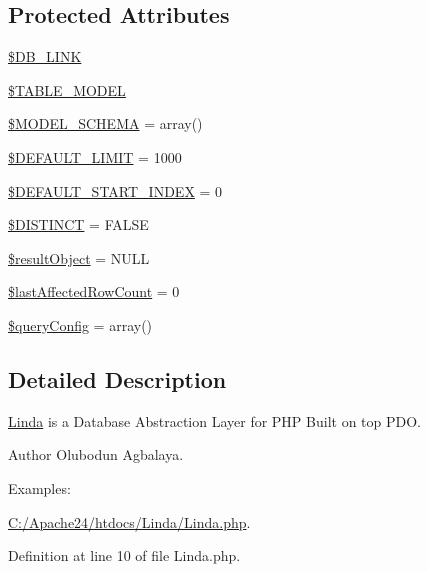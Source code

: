 \subsection*{Protected Attributes}
\begin{DoxyCompactItemize}
\item 
\hyperlink{class_linda_a11c2781ac527a1c951d9035f2d0197cc}{\$\+D\+B\+\_\+\+L\+I\+N\+K}
\item 
\hyperlink{class_linda_a486c281995ea6cdb9fb0367b6e260b76}{\$\+T\+A\+B\+L\+E\+\_\+\+M\+O\+D\+E\+L}
\item 
\hyperlink{class_linda_a46c628c6bd56ec5880da2515cf352183}{\$\+M\+O\+D\+E\+L\+\_\+\+S\+C\+H\+E\+M\+A} = array()
\item 
\hyperlink{class_linda_a97365f1875db5efbdefc5faa71249ff1}{\$\+D\+E\+F\+A\+U\+L\+T\+\_\+\+L\+I\+M\+I\+T} = 1000
\item 
\hyperlink{class_linda_a803cce07cc3e3f9937b6e5faba4100fe}{\$\+D\+E\+F\+A\+U\+L\+T\+\_\+\+S\+T\+A\+R\+T\+\_\+\+I\+N\+D\+E\+X} = 0
\item 
\hyperlink{class_linda_a8df0f16d4226b986c460429c8784ee3e}{\$\+D\+I\+S\+T\+I\+N\+C\+T} = F\+A\+L\+S\+E
\item 
\hyperlink{class_linda_a64270a514fbca17fe7347df6320fc4ba}{\$result\+Object} = N\+U\+L\+L
\item 
\hyperlink{class_linda_a038edab690e03aff9c70a1f63c06f27e}{\$last\+Affected\+Row\+Count} = 0
\item 
\hyperlink{class_linda_aea7d038e46660f55592569906cf09494}{\$query\+Config} = array()
\end{DoxyCompactItemize}


\subsection{Detailed Description}
\hyperlink{class_linda}{Linda} is a Database Abstraction Layer for P\+H\+P Built on top P\+D\+O. 

\begin{DoxyAuthor}{Author}
Olubodun Agbalaya. 
\end{DoxyAuthor}
\begin{Desc}
\item[Examples\+: ]\par
\hyperlink{_c_1_2_apache24_2htdocs_2_linda_2_linda_8php-example}{C\+:/\+Apache24/htdocs/\+Linda/\+Linda.\+php}.\end{Desc}


Definition at line 10 of file Linda.\+php.



